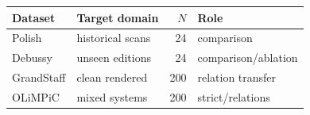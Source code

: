 \begin{center}
\begin{minipage}{\columnwidth}
\label{tab:datasets}
\centering
\small
\setlength{\tabcolsep}{3pt}
\begin{tabular}{@{}llrl@{}}
\toprule
Dataset & Target domain & $N$ & Role \\
\midrule
Polish & historical scans & 24 & comparison \\
Debussy & unseen editions & 24 & comparison/ablation \\
GrandStaff & clean rendered & 200 & relation transfer \\
OLiMPiC & mixed systems & 200 & strict/relations \\
\bottomrule
\end{tabular}
\end{minipage}
\end{center}
